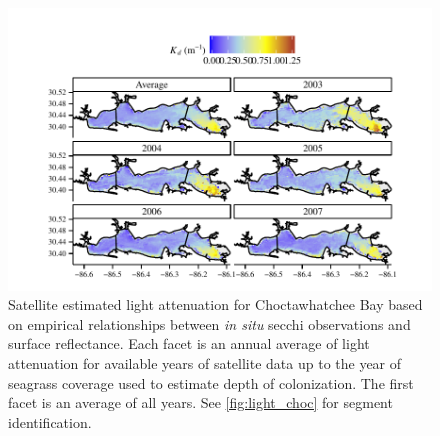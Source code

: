 \documentclass[letterpaper,12pt,oneside]{article}\usepackage[]{graphicx}\usepackage[]{color}
\begin{document}
\begin{figure}
\centering
\includegraphics[width = \textwidth]{figs/kd_choc.pdf}
\caption{Satellite estimated light attenuation for Choctawhatchee Bay based on empirical relationships between \textit{in situ} secchi observations and surface reflectance.  Each facet is an annual average of light attenuation for available years of satellite data up to the year of seagrass coverage used to estimate depth of colonization.  The first facet is an average of all years.  See \cref{fig:light_choc} for segment identification.}
\label{fig:kd_choc}
\end{figure}

\end{document}
